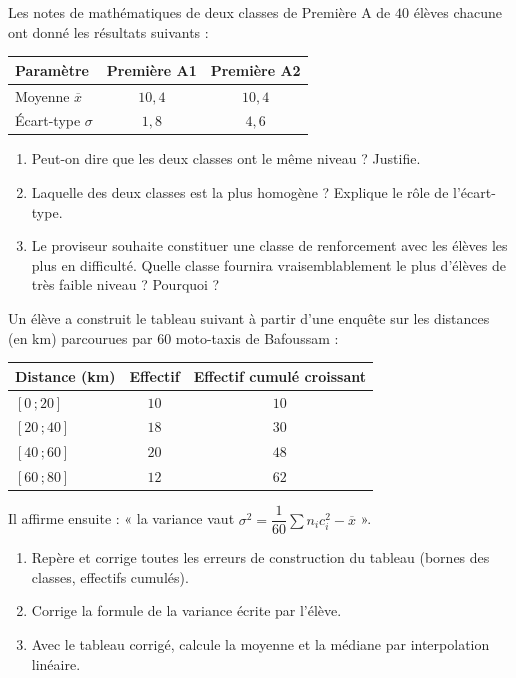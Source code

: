\documentclass[11pt]{article}
\begin{document}
\begin{exercice}
Les notes de mathématiques de deux classes de Première A de $40$ élèves chacune ont donné les résultats suivants :
\begin{center}
\begin{tabular}{|l|c|c|}
\hline
\rowcolor{popblueL} Paramètre & Première A1 & Première A2 \\
\hline
Moyenne $\overline{x}$ & $10,4$ & $10,4$ \\
\hline
Écart-type $\sigma$ & $1,8$ & $4,6$ \\
\hline
\end{tabular}
\end{center}
\begin{enumerate}
\item Peut-on dire que les deux classes ont le même niveau ? Justifie.
\item Laquelle des deux classes est la plus homogène ? Explique le rôle de l'écart-type.
\item Le proviseur souhaite constituer une classe de renforcement avec les élèves les plus en difficulté. Quelle classe fournira vraisemblablement le plus d'élèves de très faible niveau ? Pourquoi ?
\end{enumerate}
\end{exercice}

\begin{exercice}
Un élève a construit le tableau suivant à partir d'une enquête sur les distances (en km) parcourues par $60$ moto-taxis de Bafoussam :
\begin{center}
\begin{tabular}{|l|c|c|}
\hline
\rowcolor{popblueL} Distance (km) & Effectif & Effectif cumulé croissant \\
\hline
$[0\,; 20]$ & $10$ & $10$ \\
\hline
$[20\,; 40]$ & $18$ & $30$ \\
\hline
$[40\,; 60]$ & $20$ & $48$ \\
\hline
$[60\,; 80]$ & $12$ & $62$ \\
\hline
\end{tabular}
\end{center}
Il affirme ensuite : « la variance vaut $\sigma^2 = \dfrac{1}{60}\sum n_i c_i^2 - \overline{x}$ ».
\begin{enumerate}
\item Repère et corrige toutes les erreurs de construction du tableau (bornes des classes, effectifs cumulés).
\item Corrige la formule de la variance écrite par l'élève.
\item Avec le tableau corrigé, calcule la moyenne et la médiane par interpolation linéaire.
\end{enumerate}
\end{exercice}
\end{document}
